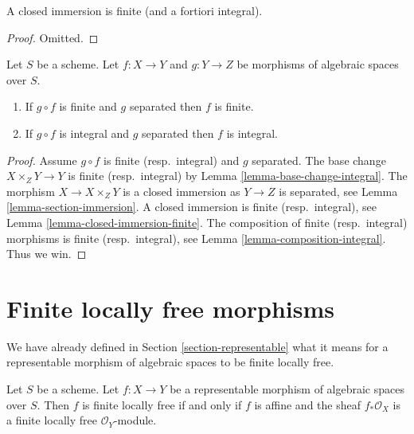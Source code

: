 \begin{lemma}
\label{lemma-closed-immersion-finite}
A closed immersion is finite (and a fortiori integral).
\end{lemma}

\begin{proof}
Omitted.
\end{proof}

\begin{lemma}
\label{lemma-finite-permanence}
Let $S$ be a scheme.
Let $f : X \to Y$ and $g : Y \to Z$ be morphisms of algebraic spaces over $S$.
\begin{enumerate}
\item If $g \circ f$ is finite and $g$ separated then $f$ is finite.
\item If $g \circ f$ is integral and $g$ separated then $f$ is integral.
\end{enumerate}
\end{lemma}

\begin{proof}
Assume $g \circ f$ is finite (resp.\ integral) and $g$ separated.
The base change $X \times_Z Y \to Y$ is finite (resp.\ integral) by
Lemma \ref{lemma-base-change-integral}.
The morphism $X \to X \times_Z Y$ is
a closed immersion as $Y \to Z$ is separated, see
Lemma \ref{lemma-section-immersion}.
A closed immersion is finite (resp.\ integral),
see Lemma \ref{lemma-closed-immersion-finite}.
The composition of finite (resp.\ integral) morphisms is finite
(resp.\ integral),
see Lemma \ref{lemma-composition-integral}. Thus we win.
\end{proof}





\section{Finite locally free morphisms}
\label{section-finite-locally-free}

\noindent
We have already defined in Section \ref{section-representable}
what it means for a representable morphism of algebraic spaces
to be finite locally free.

\begin{lemma}
\label{lemma-finite-locally-free-representable}
Let $S$ be a scheme. Let $f : X \to Y$ be a representable
morphism of algebraic spaces over $S$. Then
$f$ is finite locally free if and only if $f$ is affine and
the sheaf $f_*\mathcal{O}_X$ is a finite locally free
$\mathcal{O}_Y$-module.
\end{lemma}

